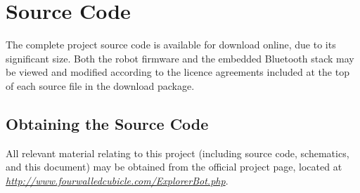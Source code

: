 \chapter{Source Code}
\label{app:sourcecode}

The complete project source code is available for download online, due to its significant size. Both the robot firmware and the embedded Bluetooth stack may be viewed and modified according to the licence agreements included at the top of each source file in the download package.

\section{Obtaining the Source Code}

All relevant material relating to this project (including source code, schematics, and this document) may be obtained from the official project page, located at \\ \href{http://www.fourwalledcubicle.com/ExplorerBot.php}{\textit{http://www.fourwalledcubicle.com/ExplorerBot.php}}.

